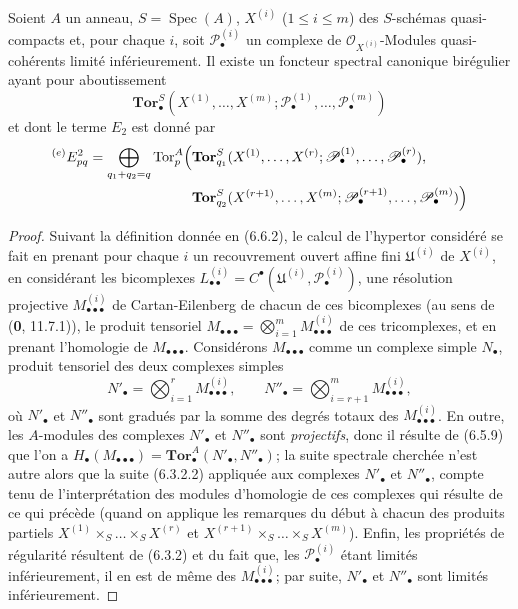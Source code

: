 \begin{corollary}[6.8.3]
Soient $A$ un anneau, $S=\operatorname{Spec}(A)$, $X^{(i)}$
($1\leq i\leq m$) des $S$-schémas quasi-compacts et, pour chaque $i$, soit
$\mathscr P_\bullet^{(i)}$ un complexe de
$\mathscr O_{X^{(i)}}$-Modules quasi-cohérents limité inférieurement. Il
existe un foncteur spectral canonique birégulier ayant pour aboutissement
\[
  \mathbf{Tor}_\bullet^S
  (X^{(1)},\ldots,X^{(m)};
   \mathscr P_\bullet^{(1)},\ldots,\mathscr P_\bullet^{(m)})
\]
et dont le terme $E_2$ est donné par
\[
\begin{split}
  {}^{(e)}E_{pq}^2
  =\bigoplus_{q_1+q_2=q}
  \operatorname{Tor}_p^A\Bigl(
  &\mathbf{Tor}_{q_1}^S
  (X^{(1)},\ldots,X^{(r)};
   \mathscr P_\bullet^{(1)},\ldots,\mathscr P_\bullet^{(r)}),\\
  &\mathbf{Tor}_{q_2}^S
  (X^{(r+1)},\ldots,X^{(m)};
   \mathscr P_\bullet^{(r+1)},\ldots,\mathscr P_\bullet^{(m)})
  \Bigr)
\end{split}
\]
\end{corollary}

\begin{proof}
Suivant la définition donnée en (6.6.2), le calcul de l'hypertor considéré se
fait en prenant pour chaque $i$ un recouvrement ouvert affine fini
$\mathfrak U^{(i)}$ de $X^{(i)}$, en considérant les bicomplexes
$L_{\bullet\bullet}^{(i)}=C^\bullet(\mathfrak U^{(i)},
\mathscr P_\bullet^{(i)})$, une résolution projective
$M_{\bullet\bullet\bullet}^{(i)}$ de Cartan-Eilenberg de chacun de ces
bicomplexes (au sens de (\textbf{0}, 11.7.1)), le produit tensoriel
$M_{\bullet\bullet\bullet}
=\bigotimes_{i=1}^m M_{\bullet\bullet\bullet}^{(i)}$
de ces tricomplexes, et en prenant l'homologie de
$M_{\bullet\bullet\bullet}$. Considérons $M_{\bullet\bullet\bullet}$ comme
un complexe simple $N_\bullet$, produit tensoriel des deux complexes simples
\[
  N'_\bullet=\bigotimes_{i=1}^r M_{\bullet\bullet\bullet}^{(i)},
  \qquad
  N''_\bullet=\bigotimes_{i=r+1}^m M_{\bullet\bullet\bullet}^{(i)},
\]
où $N'_\bullet$ et $N''_\bullet$ sont gradués par la somme des degrés totaux
des $M_{\bullet\bullet\bullet}^{(i)}$. En outre, les $A$-modules des
complexes $N'_\bullet$ et $N''_\bullet$ sont \emph{projectifs}, donc il résulte de
(6.5.9) que l'on a
$H_\bullet(M_{\bullet\bullet\bullet})
=\mathbf{Tor}_\bullet^A(N'_\bullet,N''_\bullet)$;
la suite spectrale cherchée n'est autre alors que la suite (6.3.2.2)
appliquée aux complexes $N'_\bullet$ et $N''_\bullet$, compte tenu de
l'interprétation des modules d'homologie de ces complexes qui résulte de ce
qui précède (quand on applique les remarques du début à chacun des produits
partiels
$X^{(1)}\times_S\ldots\times_S X^{(r)}$ et
$X^{(r+1)}\times_S\ldots\times_S X^{(m)}$). Enfin, les propriétés de
régularité résultent de (6.3.2) et du fait que, les
$\mathscr P_\bullet^{(i)}$ étant limités inférieurement, il en est de même
des $M_{\bullet\bullet\bullet}^{(i)}$; par suite, $N'_\bullet$ et
$N''_\bullet$ sont limités inférieurement.
\end{proof}

